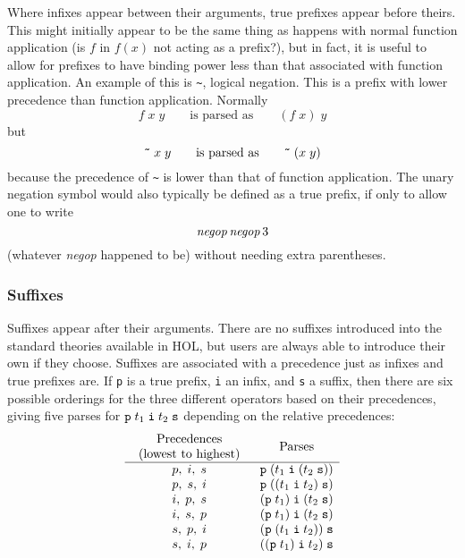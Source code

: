 \documentclass[12pt,fleqn,a4paper]{report}
\begin{document}
Where infixes appear between their arguments, true prefixes appear
before theirs.  This might initially appear to be the same thing as
happens with normal function application (is $f$ in $f(x)$ not acting
as a prefix?), but in fact, it is useful to allow for prefixes to have
binding power less than that associated with function application.  An
example of this is \verb+~+, logical negation.  This is a prefix with
lower precedence than function application.  Normally
\[
   f\;x\; y\qquad \mbox{is parsed as}\qquad (f\; x)\; y
\] but \[
  \mbox{\tt \~{}}\; x\; y\qquad\mbox{is parsed as}\qquad
  \mbox{\tt \~{}}\; (x\; y)
\] because the precedence of \verb+~+ is lower than that of function
application.  The unary negation symbol would also typically be
defined as a true prefix, if only to allow one to write \[ {\it
  negop}\,{\it negop}\,3
\] (whatever {\it negop} happened to be) without needing extra parentheses.

\subsubsection{Suffixes}

Suffixes appear after their arguments.  There are no suffixes
introduced into the standard theories available in HOL, but users are
always able to introduce their own if they choose.  Suffixes are
associated with a precedence just as infixes and true prefixes are.
If \verb+p+ is a true prefix, \verb+i+ an infix, and \verb+s+ a
suffix, then there are six possible orderings for the three different
operators based on their precedences, giving five parses for
$\verb+p+\; t_1\; \verb+i+\; t_2\; \verb+s+$ depending on the relative
precedences:
\[
\begin{array}{cl}
\mbox{\begin{tabular}{c}Precedences\\(lowest to highest)\end{tabular}} &
\multicolumn{1}{c}{\mbox{Parses}}\\
\hline
p,\;i,\;s & \verb+p+\;(t_1\;\verb+i+\;(t_2\;\verb+s+))\\
p,\;s,\;i & \verb+p+\;((t_1\;\verb+i+\;t_2)\;\verb+s+)\\
i,\;p,\;s & (\verb+p+\;t_1)\;\verb+i+\;(t_2\;\verb+s+)\\
i,\;s,\;p & (\verb+p+\;t_1)\;\verb+i+\;(t_2\;\verb+s+)\\
s,\;p,\;i & (\verb+p+\;(t_1\;\verb+i+\;t_2))\;\verb+s+\\
s,\;i,\;p & ((\verb+p+\;t_1)\;\verb+i+\;t_2)\;\verb+s+\\
\end{array}
\]
\end{document}
